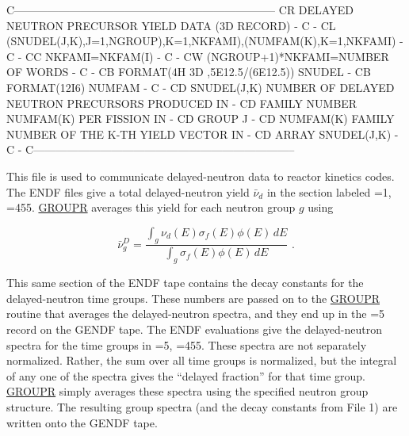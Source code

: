 \begin{ccode}
C-----------------------------------------------------------------------
CR          DELAYED NEUTRON PRECURSOR YIELD DATA   (3D RECORD)         -
C                                                                      -
CL    (SNUDEL(J,K),J=1,NGROUP),K=1,NKFAMI),(NUMFAM(K),K=1,NKFAMI)      -
C                                                                      -
CC    NKFAMI=NKFAM(I)                                                  -
C                                                                      -
CW    (NGROUP+1)*NKFAMI=NUMBER OF WORDS                                -
C                                                                      -
CB    FORMAT(4H 3D ,5E12.5/(6E12.5))  SNUDEL                           -
CB    FORMAT(12I6)                    NUMFAM                           -
C                                                                      -
CD    SNUDEL(J,K)   NUMBER OF DELAYED NEUTRON PRECURSORS PRODUCED IN   -
CD                     FAMILY NUMBER NUMFAM(K) PER FISSION IN          -
CD                     GROUP J                                         -
CD    NUMFAM(K)     FAMILY NUMBER OF THE K-TH YIELD VECTOR IN          -
CD                     ARRAY SNUDEL(J,K)                               -
C                                                                      -
C-----------------------------------------------------------------------

\end{ccode}
\normalsize

This file is used to communicate delayed-neutron data to reactor kinetics
codes.  The ENDF files give a total delayed-neutron yield $\bar{\nu}_d$
in the section labeled =1,
=455.  \hyperlink{sGROUPRhy}{GROUPR} averages this
yield for each neutron group $g$ using

\begin{equation}
   \bar{\nu}^D_g=\frac{\displaystyle\int_g \nu_d(E)\sigma_f(E)\phi(E)\,dE}
      {\displaystyle\int_g\sigma_f(E)\phi(E)\,dE} \,\,.
\end{equation}

\noindent
This same section of the ENDF tape contains the decay constants for the
delayed-neutron time groups.  These numbers are passed on to the
\hyperlink{sGROUPRhy}{GROUPR} routine that averages the
delayed-neutron spectra, and they end up in the =5
record on the GENDF tape.  The ENDF evaluations give the
delayed-neutron spectra for the time groups in =5,
=455.  These spectra are not separately
normalized.  Rather, the sum over all
time groups is normalized, but the integral of any one of the spectra
gives the ``delayed fraction'' for that time
group.  \hyperlink{sGROUPRhy}{GROUPR} simply
averages these spectra using the specified neutron group structure.
The resulting group spectra (and the decay constants from File 1) are
written onto the GENDF tape.

